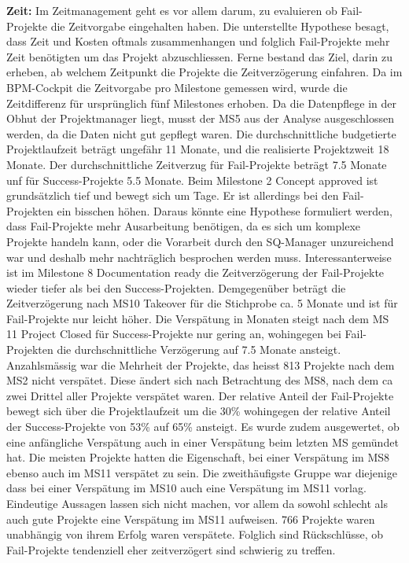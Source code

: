 \newline\newline\textbf{Zeit:} Im Zeitmanagement geht es vor allem darum, zu evaluieren ob Fail-Projekte die Zeitvorgabe eingehalten haben. Die unterstellte Hypothese besagt, dass Zeit und Kosten oftmals zusammenhangen und folglich Fail-Projekte mehr Zeit benötigten um das Projekt abzuschliessen. Ferne bestand das Ziel, darin zu erheben, ab welchem Zeitpunkt die Projekte die Zeitverzögerung einfahren. Da im BPM-Cockpit die Zeitvorgabe pro Milestone gemessen wird, wurde die Zeitdifferenz für ursprünglich fünf Milestones erhoben. Da die Datenpflege in der Obhut der Projektmanager liegt, musst der MS5 aus der Analyse ausgeschlossen werden, da die Daten nicht gut gepflegt waren. Die durchschnittliche budgetierte Projektlaufzeit beträgt ungefähr 11 Monate, und die realisierte Projektzweit 18 Monate. Der durchschnittliche Zeitverzug für Fail-Projekte beträgt 7.5 Monate unf für Success-Projekte 5.5 Monate. Beim Milestone 2 Concept approved ist grundsätzlich tief und bewegt sich um Tage. Er ist allerdings bei den Fail-Projekten ein bisschen höhen. Daraus könnte eine Hypothese formuliert werden, dass Fail-Projekte mehr Ausarbeitung benötigen, da es sich um komplexe Projekte handeln kann, oder die Vorarbeit durch den SQ-Manager unzureichend war und deshalb mehr nachträglich besprochen werden muss. Interessanterweise ist im Milestone 8 Documentation ready die Zeitverzögerung der Fail-Projekte wieder tiefer als bei den Success-Projekten. Demgegenüber beträgt die Zeitverzögerung nach MS10 Takeover für die Stichprobe ca. 5 Monate und ist für Fail-Projekte nur leicht höher. Die Verspätung in Monaten steigt nach dem MS 11 Project Closed für Success-Projekte nur gering an, wohingegen bei Fail-Projekten die durchschnittliche Verzögerung auf 7.5 Monate ansteigt. Anzahlsmässig war  die Mehrheit der Projekte, das heisst 813 Projekte nach dem MS2 nicht verspätet. Diese ändert sich nach Betrachtung des MS8, nach dem ca zwei Drittel aller Projekte verspätet waren. Der relative Anteil der Fail-Projekte bewegt sich über die Projektlaufzeit um die 30\% wohingegen der relative Anteil der Success-Projekte von 53\% auf 65\% ansteigt. Es wurde zudem ausgewertet, ob eine anfängliche Verspätung auch in einer Verspätung beim letzten MS gemündet hat. Die meisten Projekte hatten die Eigenschaft, bei einer Verspätung im MS8 ebenso auch im MS11 verspätet zu sein. Die zweithäufigste Gruppe war diejenige dass bei einer Verspätung im MS10 auch eine Verspätung im MS11 vorlag. Eindeutige Aussagen lassen sich nicht machen, vor allem da sowohl schlecht als auch gute Projekte eine Verspätung im MS11 aufweisen. 766 Projekte waren unabhängig von ihrem Erfolg waren verspätete. Folglich sind Rückschlüsse, ob Fail-Projekte tendenziell eher zeitverzögert sind schwierig zu treffen.
